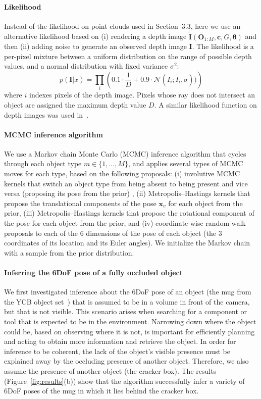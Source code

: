 \paragraph{Likelihood}
Instead of the likelihood on point clouds used in Section~3.3, here we use an alternative likelihood based on
(i) rendering a depth image $\tilde{\mathbf{I}}(\mathbf{O}_{1:M}, \mathbf{c}, G, \bm\theta)$ and then (ii) adding noise to generate an observed depth image $\mathbf{I}$.
The likelihood is a per-pixel mixture between a uniform distribution on the range of possible depth values, and a normal distribution with fixed variance $\sigma^2$:
\[
    p(\mathbf{I} | x) = \prod_i \left( 0.1 \cdot \frac{1}{D} + 0.9 \cdot \mathcal{N}(I_{i}; \tilde{I}_i, \sigma)) \right)
\]
where $i$ indexes pixels of the depth image.
Pixels whose ray does not intersect an object are assigned the maximum depth value $D$.
A similar likelihood function on depth images was used in~\citep{moreno2016overcoming}.

\paragraph{MCMC inference algorithm}
We use a Markov chain Monte Carlo (MCMC) inference algorithm that cycles through each object type $m \in \{1, \ldots, M\}$, and applies several types of MCMC moves for each type, based on the following proposals:
(i) involutive MCMC kernels that switch an object type from being absent to being present and vice versa (proposing its pose from the prior) ,
(ii) Metropolis--Hastings kernels that propose the translational components of the pose $\mathbf{x}_v$ for each object from the prior,
(iii) Metropolis--Hastings kernels that propose the rotational component of the pose for each object from the prior, and
(iv) coordinate-wise random-walk proposals to each of the 6 dimensions of the pose of each object (the 3 coordinates of its location and its Euler angles).
We initialize the Markov chain with a sample from the prior distribution.

\paragraph{Inferring the 6DoF pose of a fully occluded object}
We first investigated inference about the 6DoF pose of an object (the mug from the YCB object set~\citep{calli2015benchmarking}) that is assumed to be in a volume in front of the camera, but that is not visible.
This scenario arises when searching for a component or tool that is expected to be in the environment.
Narrowing down where the object could be, based on observing where it is not, is important for efficiently planning and acting to obtain more information and retrieve the object.
In order for inference to be coherent, the lack of the object's visible presence must be explained away by the occluding presence of another object.
Therefore, we also assume the presence of another object (the cracker box).
The results (Figure~\ref{fig:results}(b)) show that the algorithm
successfully infer a variety of 6DoF poses of the mug in which it lies behind the cracker box.

